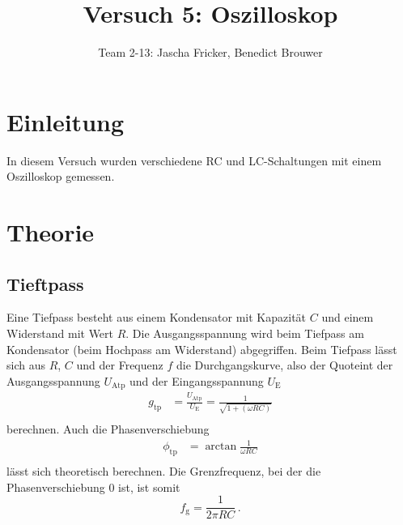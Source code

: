 \documentclass[11pt, a4paper]{article}
\title{Versuch 5: Oszilloskop}
\author{Team 2-13: Jascha Fricker, Benedict Brouwer}
\begin{document}
    \maketitle

    \tableofcontents

    \newpage

    \section{Einleitung}
    In diesem Versuch wurden verschiedene RC und LC-Schaltungen mit einem Oszilloskop gemessen.

    \section{Theorie}

    \subsection{Tieftpass}
    Eine Tiefpass besteht aus einem Kondensator mit Kapazität $C$ und einem Widerstand mit Wert $R$. Die Ausgangsspannung wird beim Tiefpass am Kondensator (beim Hochpass am Widerstand) abgegriffen.
    Beim Tiefpass lässt sich aus $R$, $C$ und der Frequenz $f$ die Durchgangskurve, also der Quoteint der Ausgangsspannung $U_{\text{Atp}}$ und der Eingangsspannung $U_{\text{E}}$ 
    \begin{align}
        g_{\text{tp}} &= \frac{U_{\text{Atp}}}{U_{\text{E}}} = \frac{1}{\sqrt{1 + \left( \omega R C \right)}} \\
    \end{align}
    berechnen. Auch die Phasenverschiebung
    \begin{align}
        \phi_{\text{tp}} &= \arctan{\frac{1}{\omega R C}} \\
    \end{align}
    lässt sich theoretisch berechnen.
    Die Grenzfrequenz, bei der die Phasenverschiebung 0 ist, ist somit
    \begin{equation}
        f_{\text{g}} = \frac{1}{2 \pi R C} \,.
    \end{equation}
\end{document}
